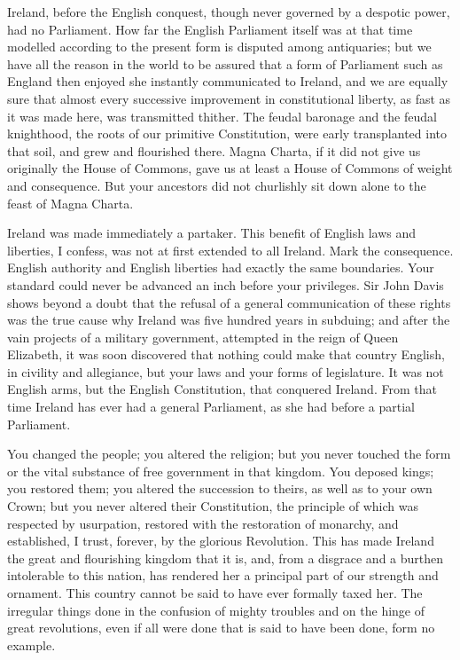 Ireland, before the English conquest, though never governed by a despotic power, had no Parliament. How far the English Parliament itself was at that time modelled according to the present form is disputed among antiquaries; but we have all the reason in the world to be assured that a form of Parliament such as England then enjoyed she instantly communicated to Ireland, and we are equally sure that almost every successive improvement in constitutional liberty, as fast as it was made here, was transmitted thither. The feudal baronage and the feudal knighthood, the roots of our primitive Constitution, were early transplanted into that soil, and grew and flourished there. Magna Charta, if it did not give us originally the House of Commons, gave us at least a House of Commons of weight and consequence. But your ancestors did not churlishly sit down alone to the feast of Magna Charta.\par

Ireland was made immediately a partaker. This benefit of English laws and liberties, I confess, was not at first extended to all Ireland. Mark the consequence. English authority and English liberties had exactly the same boundaries. Your standard could never be advanced an inch before your privileges. Sir John Davis shows beyond a doubt that the refusal of a general communication of these rights was the true cause why Ireland was five hundred years in subduing; and after the vain projects of a military government, attempted in the reign of Queen Elizabeth, it was soon discovered that nothing could make that country English, in civility and allegiance, but your laws and your forms of legislature. It was not English arms, but the English Constitution, that conquered Ireland. From that time Ireland has ever had a general Parliament, as she had before a partial Parliament.\par

You changed the people; you altered the religion; but you never touched the form or the vital substance of free government in that kingdom. You deposed kings; you restored them; you altered the succession to theirs, as well as to your own Crown; but you never altered their Constitution, the principle of which was respected by usurpation, restored with the restoration of monarchy, and established, I trust, forever, by the glorious Revolution. This has made Ireland the great and flourishing kingdom that it is, and, from a disgrace and a burthen intolerable to this nation, has rendered her a principal part of our strength and ornament. This country cannot be said to have ever formally taxed her. The irregular things done in the confusion of mighty troubles and on the hinge of great revolutions, even if all were done that is said to have been done, form no example.\par

